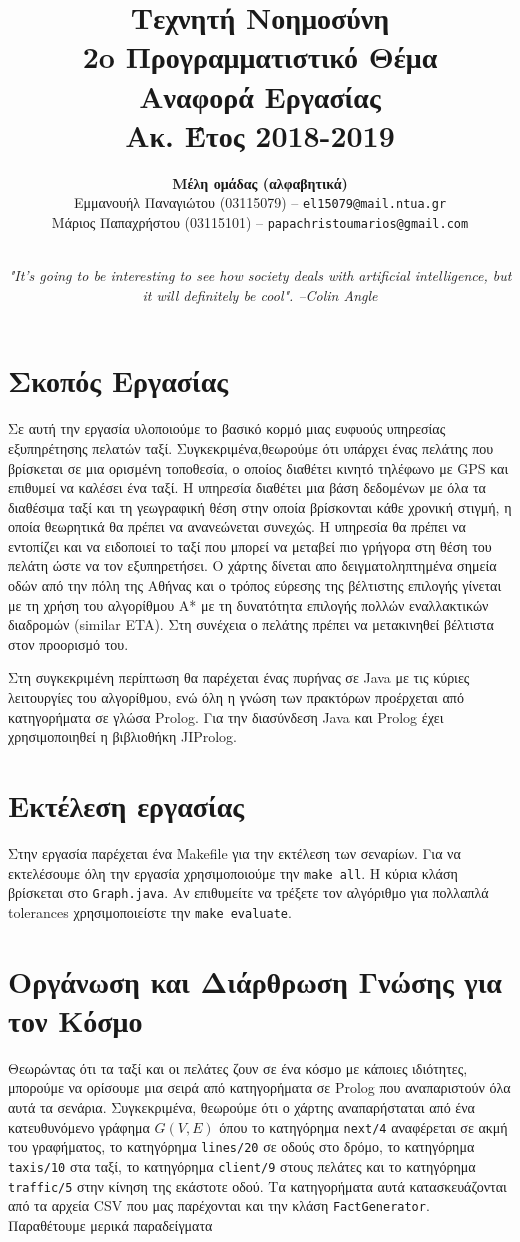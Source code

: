 \documentclass[a4paper,12pt]{article}
\title{ \textbf{Τεχνητή Νοημοσύνη}  \\ 2o Προγραμματιστικό Θέμα \\ Αναφορά Εργασίας \\ \small{Ακ. Έτος 2018-2019}}
\author{\textbf{Μέλη ομάδας (αλφαβητικά)} \\ Εμμανουήλ Παναγιώτου (03115079) -- \texttt{el15079@mail.ntua.gr} \\  Μάριος Παπαχρήστου (03115101) -- \texttt{papachristoumarios@gmail.com} \\ \noindent\rule{0.9\textwidth}{1pt}}
\date{\emph{"It's going to be interesting to see how society deals with artificial intelligence, but it will definitely be cool". --Colin Angle}}
\begin{document}
\maketitle

\section{Σκοπός Εργασίας} 

Σε αυτή την εργασία υλοποιούμε το βασικό κορμό μιας ευφυούς υπηρεσίας εξυπηρέτησης πελατών ταξί. Συγκεκριμένα,θεωρούμε ότι υπάρχει ένας πελάτης που βρίσκεται σε μια ορισμένη τοποθεσία, ο οποίος διαθέτει κινητό τηλέφωνο με GPS και επιθυμεί να καλέσει ένα ταξί. Η υπηρεσία διαθέτει μια βάση δεδομένων με όλα τα διαθέσιμα ταξί και τη γεωγραφική θέση στην
οποία βρίσκονται κάθε χρονική στιγμή, η οποία θεωρητικά θα πρέπει να ανανεώνεται συνεχώς. Η υπηρεσία θα πρέπει να εντοπίζει και να ειδοποιεί το ταξί που μπορεί να μεταβεί πιο γρήγορα στη θέση του πελάτη ώστε να τον εξυπηρετήσει. Ο χάρτης δίνεται απο δειγματοληπτημένα σημεία οδών από την πόλη της Αθήνας και ο τρόπος εύρεσης της βέλτιστης επιλογής γίνεται με τη χρήση του αλγορίθμου Α* με τη δυνατότητα επιλογής πολλών εναλλακτικών διαδρομών (similar ETA).  Στη συνέχεια ο πελάτης πρέπει να μετακινηθεί βέλτιστα στον προορισμό του.

Στη συγκεκριμένη περίπτωση θα παρέχεται ένας πυρήνας σε Java με τις κύριες λειτουργίες του αλγορίθμου, ενώ όλη η γνώση των πρακτόρων προέρχεται από κατηγορήματα σε γλώσα Prolog. Για την διασύνδεση Java και Prolog έχει χρησιμοποιηθεί η βιβλιοθήκη JIProlog. 

\section{Εκτέλεση εργασίας}

Στην εργασία παρέχεται ένα Makefile για την εκτέλεση των σεναρίων. Για να εκτελέσουμε όλη την εργασία χρησιμοποιούμε την \texttt{make all}. Η κύρια κλάση βρίσκεται στο \texttt{Graph.java}. Αν επιθυμείτε να τρέξετε τον αλγόριθμο για πολλαπλά tolerances χρησιμοποιείστε την \texttt{make evaluate}. 


\section{Οργάνωση και Διάρθρωση Γνώσης για τον Κόσμο} 

Θεωρώντας ότι τα ταξί και οι πελάτες ζουν σε ένα κόσμο με κάποιες ιδιότητες, μπορούμε να ορίσουμε μια σειρά από κατηγορήματα σε Prolog που αναπαριστούν όλα αυτά τα σενάρια. Συγκεκριμένα, θεωρούμε ότι ο χάρτης αναπαρήσταται από ένα κατευθυνόμενο γράφημα $G(V, E)$ όπου το κατηγόρημα \texttt{next/4} αναφέρεται σε ακμή του γραφήματος, το κατηγόρημα \texttt{lines/20} σε οδούς στο δρόμο, το κατηγόρημα \texttt{taxis/10} στα ταξί, το κατηγόρημα \texttt{client/9} στους πελάτες και το κατηγόρημα \texttt{traffic/5} στην κίνηση της εκάστοτε οδού. Τα κατηγορήματα αυτά κατασκευάζονται από τα αρχεία CSV που μας παρέχονται και την κλάση \texttt{FactGenerator}. Παραθέτουμε μερικά παραδείγματα
\end{document}

